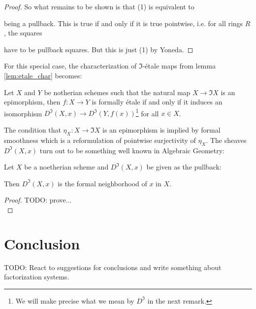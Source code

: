 \documentclass[9pt,twosided]{amsart}
\newcommand{\todo}[1]{{\color{red}TODO: #1 \\}}
\begin{document}
\begin{proof}
  So what remains to be shown is that (1) is equivalent to 
  \begin{center}
  \end{center}
  being a pullback. This is true if and only if it is true pointwise, i.e. for all rings $R$,
  the squares 
  \begin{center}
  \end{center}
  have to be pullback squares. But this is just (1) by Yoneda.
\end{proof}

For this special case, the characterization of $\Im$-étale maps from lemma \ref{lem:etale_char} becomes:

Let $X$ and $Y$ be notherian schemes such that the natural map $X\to \Im X$ is an epimorphism,
then $f:X\to Y$ is formally étale if and only if it induces an isomorphism $D^\Im(X,x)\to D^\Im(Y,f(x))$\footnote{We will make precise what we mean by $D^\Im$ in the next remark. } for all $x\in X$.

The condition that $\eta_X:X\to \Im X$ is an epimorphism is implied by formal smoothness which is a reformulation of pointwise surjectivity of $\eta_X$.
The sheaves $D^\Im(X,x)$ turn out to be something well known in Algebraic Geometry: 
\begin{rmk}
  Let $X$ be a noetherian scheme and $D^\Im(X,x)$ be given as the pullback:
  \begin{center}
  \end{center}
  Then $D^\Im(X,x)$ is the formal neighborhood of $x$ in $X$. 
\end{rmk}
\begin{proof}
  \todo{prove...}
\end{proof}


\section{Conclusion}
\todo{React to suggestions for conclusions and write something about factorization systems.}

\printbibliography
\end{document}
